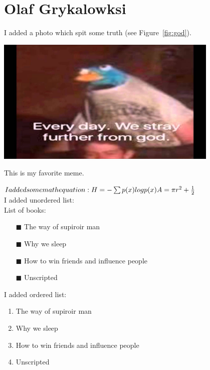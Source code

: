 \newpage
\section{Olaf Grykalowksi}
\label{PlaFon}

I added a photo which spit some truth (see Figure~\ref{fig:god}).

\begin{meme}
    \centering
    \includegraphics[width=0.8\textwidth]{pictures/god.jpg}
    \begin{center}
    \caption{This is my favorite meme.}
    \end{center}
    \label{fig:god}
\end{meme}

\begin{math}

I added some math equation:\newline
    
    H = -\sum p(x) log p(x) \newline
    
    A = \pi r^2 + \frac{1}{2}
    \\
\end{math}
\\
I added unordered list: \\
\newline
List of books:
\begin{itemize}

    \item[$\blacksquare$] The way of supiroir man 
    \item[$\blacksquare$] Why we sleep 
    \item[$\blacksquare$] How to win friends and influence people
    \item[$\blacksquare$] Unscripted
    
\end{itemize}

\newline
I added ordered list: 
\begin{enumerate}
    \item The way of supiroir man 
    \item Why we sleep 
    \item How to win friends and influence people
    \item Unscripted
\end{enumerate}


